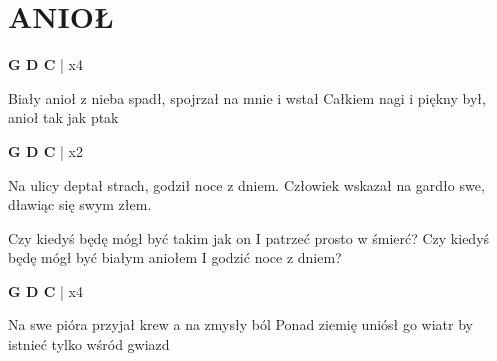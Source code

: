 \documentclass[../../../songbook.tex]{subfiles}
\begin{document}
\TabPositions{8cm} %
\section*{ANIOŁ}
{}
\vspace{0.5cm}
{\color{red}\textbf{G D C} } | x4 \newline

Biały anioł z nieba spadł, spojrzał na mnie i wstał \newline
Całkiem nagi i piękny był, anioł tak jak ptak \newline

{\color{red}\textbf{G D C} } | x2 \newline

Na ulicy deptał strach, godził noce z dniem.		 \newline
Człowiek wskazał na gardło swe, dławiąc się swym złem. \newline

\-\hspace{1cm} Czy kiedyś będę mógł być takim jak on  \newline
\-\hspace{1cm} I patrzeć prosto w śmierć? \newline
\-\hspace{1cm} Czy kiedyś będę mógł być białym aniołem  \newline
\-\hspace{1cm} I godzić noce z dniem? \newline

{\color{red}\textbf{G D C} } | x4 \newline

Na swe pióra przyjał krew a na zmysły ból		 \newline
Ponad ziemię uniósł go wiatr by istnieć tylko wśród gwiazd	 \newline
\end{document}
